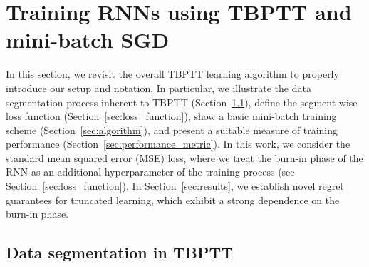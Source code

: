 \documentclass{article} %
\begin{document}
\section{Training RNNs using TBPTT and mini-batch SGD}

{In this section, we revisit the overall TBPTT learning algorithm to properly introduce our setup and notation. In particular, we illustrate the data segmentation process inherent to TBPTT (Section~\ref{sec:data_segmentation}), define the segment-wise loss function (Section~\ref{sec:loss_function}), show a basic {mini-}batch training scheme (Section~\ref{sec:algorithm}), and present a suitable measure of training performance (Section~\ref{sec:performance_metric}).
In this work, we consider the standard mean squared error (MSE) loss, where we treat the burn-in phase of the RNN as an additional hyperparameter of the training process (see Section~\ref{sec:loss_function}). In Section~\ref{sec:results}, we establish novel regret guarantees for truncated learning, which exhibit a strong dependence on the burn-in phase.}



\subsection{Data segmentation in TBPTT}\label{sec:data_segmentation}
\end{document}
